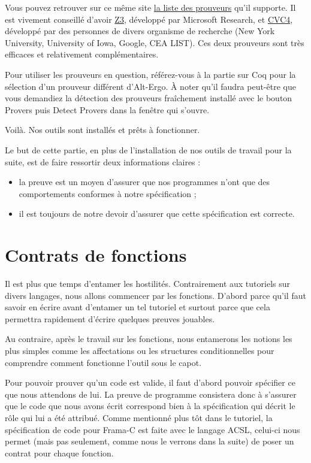 \documentclass[12pt,francais,]{scrbook}
\providecommand{\tightlist}{%
  \setlength{\itemsep}{0pt}\setlength{\parskip}{0pt}}
\begin{document}
Vous pouvez retrouver sur ce même site
\href{http://why3.lri.fr/\#provers}{la liste des prouveurs} qu'il
supporte. Il est vivement conseillé d'avoir
\href{https://github.com/Z3Prover/z3/wiki}{Z3}, développé par Microsoft
Research, et \href{http://cvc4.cs.nyu.edu/web/}{CVC4}, développé par des
personnes de divers organisme de recherche (New York University,
University of Iowa, Google, CEA LIST). Ces deux prouveurs sont très
efficaces et relativement complémentaires.

Pour utiliser les prouveurs en question, référez-vous à la partie sur
Coq pour la sélection d'un prouveur différent d'Alt-Ergo. À noter qu'il
faudra peut-être que vous demandiez la détection des prouveurs
fraîchement installé avec le bouton \og{}Provers\fg{} puis \og{}Detect Provers\fg{}
dans la fenêtre qui s'ouvre.

Voilà. Nos outils sont installés et prêts à fonctionner.

Le but de cette partie, en plus de l'installation de nos outils de
travail pour la suite, est de faire ressortir deux informations claires
:

\begin{itemize}
\tightlist
\item
  la preuve est un moyen d'assurer que nos programmes n'ont que des
  comportements conformes à notre spécification ;
\item
  il est toujours de notre devoir d'assurer que cette spécification est
  correcte.
\end{itemize}

\chapter{Contrats de fonctions}\label{contrats-de-fonctions}

Il est plus que temps d'entamer les hostilités. Contrairement aux
tutoriels sur divers langages, nous allons commencer par les fonctions.
D'abord parce qu'il faut savoir en écrire avant d'entamer un tel
tutoriel et surtout parce que cela permettra rapidement d'écrire
quelques preuves jouables.

Au contraire, après le travail sur les fonctions, nous entamerons les
notions les plus simples comme les affectations ou les structures
conditionnelles pour comprendre comment fonctionne l'outil sous le
capot.

Pour pouvoir prouver qu'un code est valide, il faut d'abord pouvoir
spécifier ce que nous attendons de lui. La preuve de programme
consistera donc à s'assurer que le code que nous avons écrit correspond
bien à la spécification qui décrit le rôle qui lui a été attribué. Comme
mentionné plus tôt dans le tutoriel, la spécification de code pour
Frama-C est faite avec le langage ACSL, celui-ci nous permet (mais pas
seulement, comme nous le verrons dans la suite) de poser un contrat pour
chaque fonction.
\end{document}
